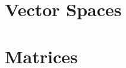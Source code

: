 \documentclass[11pt,oneside]{book}
\begin{document}





\newpage
\chapter{Vector Spaces}

\newpage
\chapter{Matrices}

\end{document}
